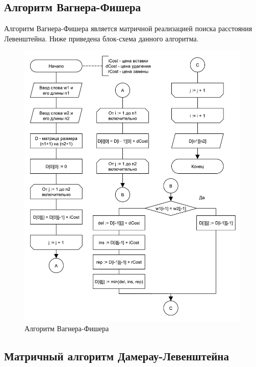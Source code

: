 \subsection{Алгоритм Вагнера-Фишера}
Алгоритм Вагнера-Фишера является матричной реализацией поиска расстояния Левенштейна. Ниже приведена блок-схема данного алгоритма.
\begin{figure}
    \centering
    \includegraphics[scale=0.8]{pdf/wagner-fischer-all.pdf}
    \caption{Алгоритм Вагнера-Фишера}
\end{figure}

\newpage
\subsection{Матричный алгоритм Дамерау-Левенштейна}

